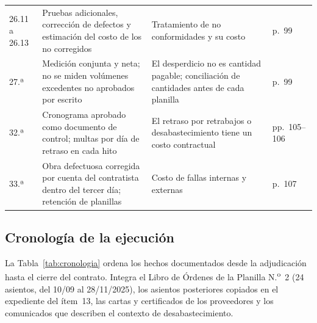 \begin{longtable}{@{}P{1.7cm}P{5.8cm}P{6.0cm}P{2.0cm}@{}}
26.11 a 26.13 & Pruebas adicionales, corrección de defectos y estimación del costo de los no corregidos & Tratamiento de no conformidades y su costo & p.~99 \\
27.ª & Medición conjunta y neta; no se miden volúmenes excedentes no aprobados por escrito & El desperdicio no es cantidad pagable; conciliación de cantidades antes de cada planilla & p.~99 \\
32.ª & Cronograma aprobado como documento de control; multas por día de retraso en cada hito & El retraso por retrabajos o desabastecimiento tiene un costo contractual & pp.~105--106 \\
33.ª & Obra defectuosa corregida por cuenta del contratista dentro del tercer día; retención de planillas & Costo de fallas internas y externas & p.~107 \\
\end{longtable}
\vspace{-6pt}
\endgroup

\subsection{Cronología de la ejecución}
\label{sec:cronologia}

La Tabla~\ref{tab:cronologia} ordena los hechos documentados desde la adjudicación hasta el cierre del contrato. Integra el Libro de Órdenes de la Planilla N.\textsuperscript{o}~2 (24 asientos, del 10/09 al 28/11/2025), los asientos posteriores copiados en el expediente del ítem~13, las cartas y certificados de los proveedores y los comunicados que describen el contexto de desabastecimiento.

